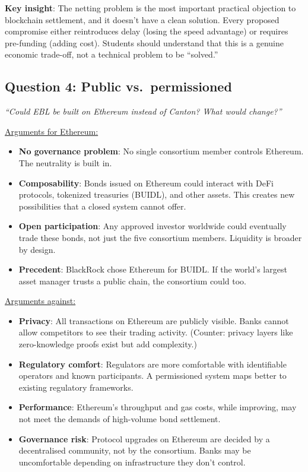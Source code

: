\documentclass[11pt]{article}
\begin{document}
\medskip
\noindent\textbf{Key insight}: The netting problem is the most important practical objection to blockchain settlement, and it doesn't have a clean solution. Every proposed compromise either reintroduces delay (losing the speed advantage) or requires pre-funding (adding cost). Students should understand that this is a genuine economic trade-off, not a technical problem to be ``solved.''

\subsection*{Question 4: Public vs.\ permissioned}

\textit{``Could EBL be built on Ethereum instead of Canton? What would change?''}

\medskip
\noindent\underline{Arguments for Ethereum:}
\begin{itemize}[leftmargin=*]
\item \textbf{No governance problem}: No single consortium member controls Ethereum. The neutrality is built in.
\item \textbf{Composability}: Bonds issued on Ethereum could interact with DeFi protocols, tokenized treasuries (BUIDL), and other assets. This creates new possibilities that a closed system cannot offer.
\item \textbf{Open participation}: Any approved investor worldwide could eventually trade these bonds, not just the five consortium members. Liquidity is broader by design.
\item \textbf{Precedent}: BlackRock chose Ethereum for BUIDL. If the world's largest asset manager trusts a public chain, the consortium could too.
\end{itemize}

\medskip
\noindent\underline{Arguments against:}
\begin{itemize}[leftmargin=*]
\item \textbf{Privacy}: All transactions on Ethereum are publicly visible. Banks cannot allow competitors to see their trading activity. (Counter: privacy layers like zero-knowledge proofs exist but add complexity.)
\item \textbf{Regulatory comfort}: Regulators are more comfortable with identifiable operators and known participants. A permissioned system maps better to existing regulatory frameworks.
\item \textbf{Performance}: Ethereum's throughput and gas costs, while improving, may not meet the demands of high-volume bond settlement.
\item \textbf{Governance risk}: Protocol upgrades on Ethereum are decided by a decentralised community, not by the consortium. Banks may be uncomfortable depending on infrastructure they don't control.
\end{itemize}
\end{document}
